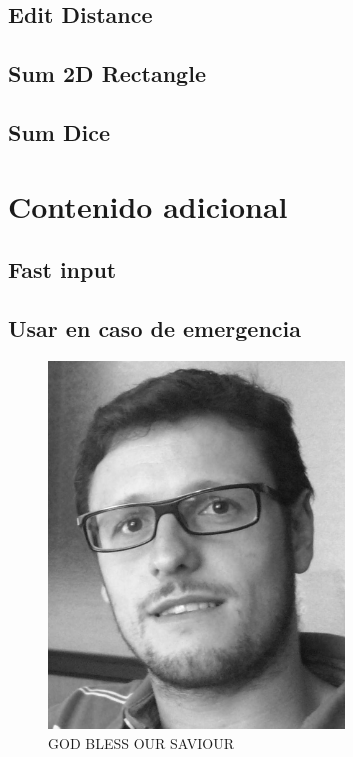 \documentclass[oneside]{book}
\begin{document}
	\section{Edit Distance}
	
	\section{Sum 2D Rectangle}
	
	\section{Sum Dice}
	
	
	
	
	\chapter{Contenido adicional}
	\section{Fast input}
	
	\section{Usar en caso de emergencia}
	\begin{figure}[h]
		\centering
		\includegraphics[width=0.7\textwidth]{foto}
		\caption*{GOD BLESS OUR SAVIOUR}
	\end{figure}
	\backmatter
	\printindex
\end{document}
